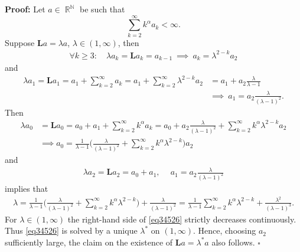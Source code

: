 \documentclass[a4paper, 11pt]{article}
\newenvironment{Proof}{\noindent \textbf{Proof:}}{\hfill$\square$\\}
\DeclareMathOperator{\N}{\mathbb{N}}
\DeclareMathOperator{\R}{\mathbb{R}}
\numberwithin{equation}{section}
\theoremstyle{plain}
\theoremstyle{remark}
\theoremstyle{definition}
\begin{document}
\begin{Proof}
Let $a \in \R^{\N}$ be such that
\begin{equation*}
\sum_{k=2}^\infty k^\alpha a_k < \infty.
\end{equation*}
Suppose $\mathbf{L}a = \lambda a$, $\lambda \in (1,\infty)$, then
\begin{align} \label{eq34765}
\forall k \geq 3: \quad \lambda a_k = \mathbf{L}a_k = a_{k-1} \ \implies \ a_k = \lambda^{2-k}a_2
\end{align}
and
\begin{align*}
\lambda a_1 = \mathbf{L}a_1 = a_1 + \sum_{k=2}^\infty a_k = a_1 + \sum_{k=2}^\infty \lambda^{2-k}a_2 &= a_1 + a_2\frac{\lambda}{\lambda-1} \\
& \implies \ a_1 = a_2\frac{\lambda}{(\lambda-1)^2}.
\end{align*}
Then
\begin{equation*}\begin{aligned}
\lambda a_0 &= \mathbf{L}a_0 = a_0 + a_1 + \sum_{k=2}^\infty k^\alpha a_k = a_0 + a_2\frac{\lambda}{(\lambda-1)^2} + \sum_{k=2}^\infty k^\alpha \lambda^{2-k}a_2 \\
&\implies  a_0 = \frac{1}{\lambda-1}\Big(\frac{\lambda}{(\lambda-1)^2} + \sum_{k=2}^\infty k^\alpha \lambda^{2-k}\Big)a_2
\end{aligned}\end{equation*}
and
\begin{equation*}\begin{aligned}
\lambda a_2 = \mathbf{L}a_2 = a_0 + a_1, \quad \ a_1 = a_2\frac{\lambda}{(\lambda-1)^2}
\end{aligned}\end{equation*}
implies that
\begin{equation}\begin{aligned} \label{eq34526}
\lambda = \frac{1}{\lambda-1}\Big(\frac{\lambda}{(\lambda-1)^2} + \sum_{k=2}^\infty k^\alpha \lambda^{2-k}\Big) + \frac{\lambda}{(\lambda-1)^2} = \frac{1}{\lambda-1}\sum_{k=2}^\infty k^\alpha \lambda^{2-k} + \frac{\lambda^2}{(\lambda-1)^3}.
\end{aligned}\end{equation}
For $\lambda \in (1,\infty)$ the right-hand side of \eqref{eq34526} strictly decreases continuously. Thus \eqref{eq34526} is solved by a unique $\lambda^*$ on $(1,\infty)$. Hence, choosing $a_2$ sufficiently large, the claim on the existence of  $\mathbf{L}a = \lambda^*a$ also follows.
\end{Proof}
\end{document}
